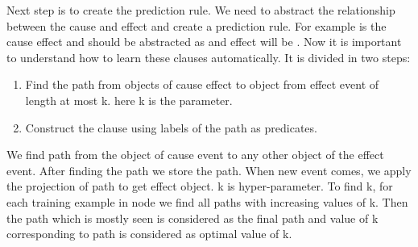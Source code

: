 \documentclass[journal,onecolumn,11pt]{IEEEtran}
\begin{document}
Next step is to create the prediction rule. We need to abstract the relationship between the cause and effect and create a prediction rule. For example  is the cause effect and  should be abstracted as  and effect will be . Now it is important to understand how to learn these clauses automatically. It is divided in two steps:
\begin{enumerate}
\item Find the path from objects of cause effect to object from effect event of length at most k. here k is the parameter.
\item Construct the clause using labels of the 
path as predicates.
\end{enumerate}

We find path from the object of cause event to any other object of the effect event. 
After finding the path we store the path. When new event comes, we apply the projection of path to get effect object. k is hyper-parameter. To find k, for each training example in node we find all paths with increasing values of k. Then the path which is mostly seen is considered as the final path and value of k corresponding to path is considered as optimal value of k.
\end{document}
